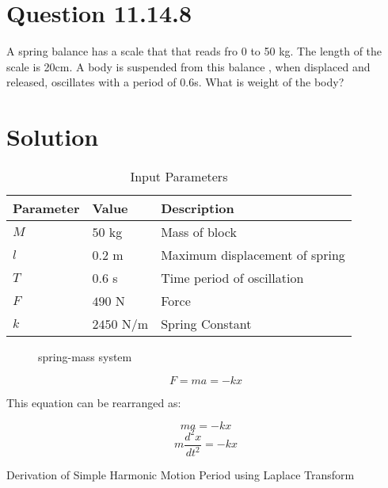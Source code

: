 \documentclass[journal,12pt,twocolumn]{IEEEtran}
\theoremstyle{remark}
\begin{document}
\section{Question 11.14.8}A spring balance has a scale that that reads fro 0 to 50 kg. The length of the scale is 20cm. A body is suspended from this balance , when displaced and released, oscillates with a period of 0.6s. What is weight of the body? 

\section{Solution}
\fi
\begin{table}[htbp]
    \centering
    \caption{Input Parameters}
    \label{tab:parameters}
	\begin{tabular}{|p{1.2cm}|p{1cm}|p{4cm}|}
        \hline
        \textbf{Parameter} & \textbf{Value} & \textbf{Description} \\
        \hline
        $M$ & $50$ kg & Mass of block \\
        \hline
        $l$ & $0.2$ m & Maximum displacement of spring \\
        \hline
	$T$ & $0.6$ s & Time period of oscillation \\
        \hline
	$F$ & $490$ N & Force \\
        \hline
	$k$ & $2450$ N/m & Spring Constant \\
        \hline
    \end{tabular}
\end{table}

\begin{figure}[!h]
    \centering
        \resizebox{0.6\columnwidth}{!}{%
        }
    \caption{ spring-mass system}
    \label{fig:spring-mass-system}
\end{figure}

\begin{equation} 
	F = ma = -kx
\end{equation}

This equation can be rearranged as:

\begin{equation}
	ma = -kx 
\end{equation}
\begin{equation}
	m\frac{d^2x}{dt^2} = -kx 
\end{equation}


Derivation of Simple Harmonic Motion Period using Laplace Transform
\end{document}

